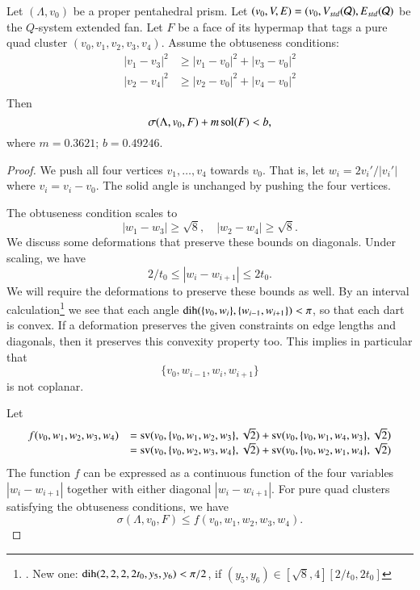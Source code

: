 \begin{lemma}
Let $(\Lambda,v_0)$ be a proper pentahedral prism.
Let $(v_0,V,E) = (v_0,V_{std}({\mathcal Q}),E_{std}({\mathcal Q})$ be the $Q$-system
extended fan.
Let $F$ be a face
of its hypermap that tags a pure quad cluster $(v_0,v_1,v_2,v_3,v_4)$.
Assume the obtuseness conditions:
  $$
  \begin{array}{lll}
  |v_1-v_3|^2 &\ge |v_1-v_0|^2 + |v_3-v_0|^2\\
  |v_2-v_4|^2 &\ge |v_2-v_0|^2 + |v_4-v_0|^2\\
  \end{array}
  $$
Then
  $$
  \sigma(\Lambda,v_0,F) + m \operatorname{sol}(F) < b, 
  $$
where $m = 0.3621$; $b = 0.49246$.
\end{lemma}

\begin{proof}
We push all four vertices $v_1,\ldots,v_4$ towards $v_0$.
That is, let $w_i = 2 v_i'/|v_i'|$ where $v_i = v_i-v_0$.
The solid angle is unchanged by pushing the four vertices.

The obtuseness condition scales to
   $$|w_1-w_3|\ge \sqrt8,\quad |w_2-w_4|\ge \sqrt8.$$
We discuss some deformations that preserve these bounds on diagonals.
Under scaling, we have
   $$2/t_0 \le |w_i - w_{i+1}|\le 2t_0.$$
We will require the deformations to preserve these bounds as well.
By an interval calculation\footnote{. New one:
$\operatorname{dih}(2,2,2,2t_0,y_5,y_6) < \pi/2$, if $(y_5,y_6)\in[\sqrt8,4][2/t_0,2t_0]$}
we see that each angle $\operatorname{dih}(\{v_0,w_i\},\{w_{i-1},w_{i+1}\}) < \pi$, so
that each dart is convex.  If a deformation preserves the given
constraints on edge lengths and diagonals, then it preserves this
convexity property too.  This implies in particular that
$$\{v_0,w_{i-1},w_i,w_{i+1}\}$$
is not coplanar.

Let 
$$
  \begin{array}{lll}
  f(v_0,w_1,w_2,w_3,w_4) &= {\operatorname{sv}}(v_0,\{v_0,w_1,w_2,w_3\},\sqrt2) +
    {\operatorname{sv}}(v_0,\{v_0,w_1,w_4,w_3\},\sqrt2) \\
  &= {\operatorname{sv}}(v_0,\{v_0,w_2,w_3,w_4\},\sqrt2) +
    {\operatorname{sv}}(v_0,\{v_0,w_2,w_1,w_4\},\sqrt2) \\
  \end{array}
$$
The function $f$ can be expressed as a continuous function
of the four variables $|w_i-w_{i+1}|$ together with either diagonal
$|w_i-w_{i+1}|$.
For pure quad clusters satisfying the obtuseness conditions, 
we have 
$$\sigma(\Lambda,v_0,F) \le f(v_0,w_1,w_2,w_3,w_4).$$


\end{proof}
